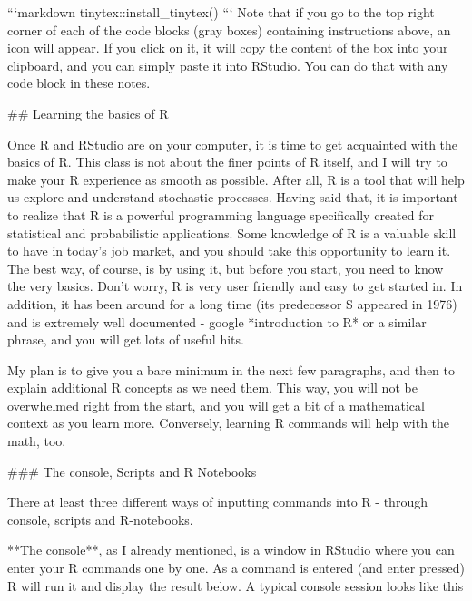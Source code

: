 \documentclass[
]{book}
\theoremstyle{definition}
\theoremstyle{definition}
\theoremstyle{definition}
\theoremstyle{definition}
\theoremstyle{remark}
\begin{document}
```markdown
tinytex::install_tinytex()
```
Note that if you go to the top right corner of each of the code blocks (gray boxes) containing instructions above, an icon will appear. If you click on it, it will copy the content of the box into your clipboard, and you can simply paste it into RStudio. You can do that with any code block in these notes.

## Learning the  basics of R

Once R and RStudio are on your computer, it is time to get acquainted with the basics of R. This class is not about the finer points of R itself, and I will try to make your R experience as smooth as possible. After all, R is a tool that will help us explore and understand stochastic processes. Having said  that, it is important to realize that R is a powerful programming language specifically created for statistical and probabilistic applications. Some knowledge of R is a valuable skill to have in today's job market, and you should take this opportunity to learn it. The best way, of course, is by using it, but before you start, you need to know the very basics. Don't worry, R is very user friendly and easy to get started in. In addition, it has been around for a long time (its predecessor S appeared in 1976) and is extremely well documented -  google *introduction to R* or a similar phrase, and you will get lots of useful hits. 

My plan is to give you a bare minimum in the next few paragraphs, and then to explain additional R concepts as we need them. This way, you will not be overwhelmed right from the start, and you will get a bit of a mathematical context as you learn more. Conversely, learning R commands will help with the math, too.

### The console, Scripts and R Notebooks

There at least  three different ways of inputting commands into R - through console, scripts and R-notebooks.  

**The console**, as I already mentioned, is a window in RStudio where you can enter your R commands one by one. As a command is entered (and enter pressed) R will run it and display the result below. A typical console session looks like this
\end{document}
